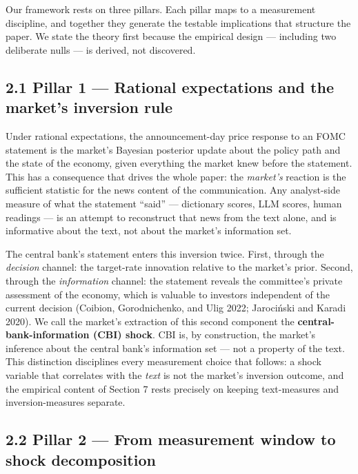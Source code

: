Our framework rests on three pillars. Each pillar maps to a measurement discipline, and together they generate the testable implications that structure the paper. We state the theory first because the empirical design --- including two deliberate nulls --- is derived, not discovered.

\subsection{2.1 Pillar 1 --- Rational expectations and the market's inversion rule}\label{pillar-1-rational-expectations-and-the-markets-inversion-rule}

Under rational expectations, the announcement-day price response to an FOMC statement is the market's Bayesian posterior update about the policy path and the state of the economy, given everything the market knew before the statement. This has a consequence that drives the whole paper: the \emph{market's} reaction is the sufficient statistic for the news content of the communication. Any analyst-side measure of what the statement ``said'' --- dictionary scores, LLM scores, human readings --- is an attempt to reconstruct that news from the text alone, and is informative about the text, not about the market's information set.

The central bank's statement enters this inversion twice. First, through the \emph{decision} channel: the target-rate innovation relative to the market's prior. Second, through the \emph{information} channel: the statement reveals the committee's private assessment of the economy, which is valuable to investors independent of the current decision (Coibion, Gorodnichenko, and Ulig 2022; Jarociński and Karadi 2020). We call the market's extraction of this second component the \textbf{central-bank-information (CBI) shock}. CBI is, by construction, the market's inference about the central bank's information set --- not a property of the text. This distinction disciplines every measurement choice that follows: a shock variable that correlates with the \emph{text} is not the market's inversion outcome, and the empirical content of Section 7 rests precisely on keeping text-measures and inversion-measures separate.

\subsection{2.2 Pillar 2 --- From measurement window to shock decomposition}\label{pillar-2-from-measurement-window-to-shock-decomposition}

